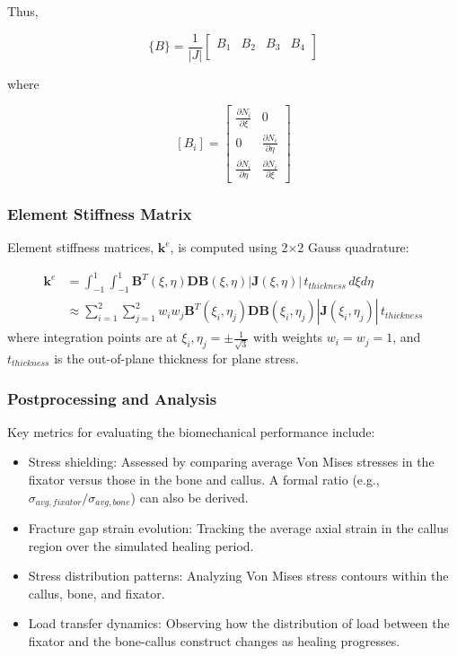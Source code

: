 \documentclass{article}
\begin{document}
Thus,

\[
\{B\} = \frac{1}{|J|}
\begin{bmatrix}
B_1 & B_2 & B_3 & B_4 \\
\end{bmatrix}
\]

where

\[
[B_i] = \begin{bmatrix}
\frac{\partial N_i}{\partial \xi} & 0 \\
0 & \frac{\partial N_i}{\partial \eta} \\
\frac{\partial N_i}{\partial \eta} & \frac{\partial N_i}{\partial \xi}
\end{bmatrix}
\]

\subsubsection{Element Stiffness Matrix}

Element stiffness matrices, $\mathbf{k}^e$, is computed using 2$\times$2 Gauss quadrature:

\begin{align*}
  \mathbf{k}^e & = \int_{-1}^{1}\int_{-1}^{1} \mathbf{B}^T(\xi,\eta)\mathbf{D}\mathbf{B}(\xi,\eta)|\mathbf{J}(\xi,\eta)| \, t_{thickness} \, d\xi d\eta             \\
                & \approx \sum_{i=1}^{2}\sum_{j=1}^{2} w_iw_j\mathbf{B}^T(\xi_i,\eta_j)\mathbf{D}\mathbf{B}(\xi_i,\eta_j)|\mathbf{J}(\xi_i,\eta_j)| \, t_{thickness}
\end{align*}
where integration points are at $\xi_i,\eta_j = \pm\frac{1}{\sqrt{3}}$ with weights $w_i=w_j=1$, and $t_{thickness}$ is the out-of-plane thickness for plane stress.

\subsubsection{Postprocessing and Analysis}

Key metrics for evaluating the biomechanical performance include:
\begin{itemize}
  \item Stress shielding: Assessed by comparing average Von Mises stresses in the fixator versus those in the bone and callus. A formal ratio (e.g., $\sigma_{avg,fixator}/\sigma_{avg,bone}$) can also be derived.
  \item Fracture gap strain evolution: Tracking the average axial strain in the callus region over the simulated healing period.
  \item Stress distribution patterns: Analyzing Von Mises stress contours within the callus, bone, and fixator.
  \item Load transfer dynamics: Observing how the distribution of load between the fixator and the bone-callus construct changes as healing progresses.
\end{itemize}
\end{document}
